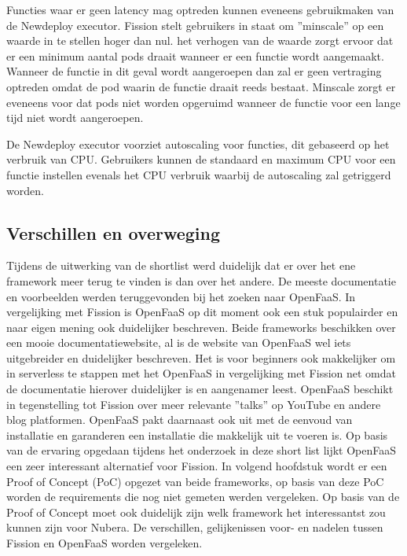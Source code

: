 \begin{description}[style=unboxed, labelwidth=\linewidth, listparindent =0pt]
    
    Functies waar er geen latency mag optreden kunnen eveneens gebruikmaken van de Newdeploy executor. Fission stelt gebruikers in staat om ''minscale'' op een waarde in te stellen hoger dan nul. het verhogen van de waarde zorgt ervoor dat er een minimum aantal pods draait wanneer er een functie wordt aangemaakt. Wanneer de functie in dit geval wordt aangeroepen dan zal er geen vertraging optreden omdat de pod waarin de functie draait reeds bestaat. Minscale zorgt er eveneens voor dat pods niet worden opgeruimd wanneer de functie voor een lange tijd niet wordt aangeroepen.
    \autocite{Fission2019}
    \\
    
    \item[Autoscaling]
    De Newdeploy executor voorziet autoscaling voor functies, dit gebaseerd op het verbruik van CPU. Gebruikers kunnen de standaard en maximum CPU voor een functie instellen evenals het CPU verbruik waarbij de autoscaling zal getriggerd worden. \autocite{Fission2019}
    \\
\end{description}

\newpage
\subsection{Verschillen en overweging}
Tijdens de uitwerking van de shortlist werd duidelijk dat er over het ene framework meer terug te vinden is dan over het andere. De meeste documentatie en voorbeelden werden teruggevonden bij het zoeken naar OpenFaaS. In vergelijking met Fission is OpenFaaS op dit moment ook een stuk populairder en naar eigen mening ook duidelijker beschreven. Beide frameworks beschikken over een mooie documentatiewebsite, al is de website van OpenFaaS wel iets uitgebreider en duidelijker beschreven. Het is voor beginners ook makkelijker om in serverless te stappen met het OpenFaaS in vergelijking met Fission net omdat de documentatie hierover duidelijker is en aangenamer leest. OpenFaaS beschikt in tegenstelling tot Fission over meer relevante ''talks'' op YouTube en andere blog platformen. OpenFaaS pakt daarnaast ook uit met de eenvoud van installatie en garanderen een installatie die makkelijk uit te voeren is. Op basis van de ervaring opgedaan tijdens het onderzoek in deze short list lijkt OpenFaaS een zeer interessant alternatief voor Fission. In volgend hoofdstuk wordt er een Proof of Concept (PoC) opgezet van beide frameworks, op basis van deze PoC worden de requirements die nog niet gemeten werden vergeleken. Op basis van de Proof of Concept moet ook duidelijk zijn welk framework het interessantst zou kunnen zijn voor Nubera. De verschillen, gelijkenissen voor- en nadelen tussen Fission en OpenFaaS worden vergeleken.